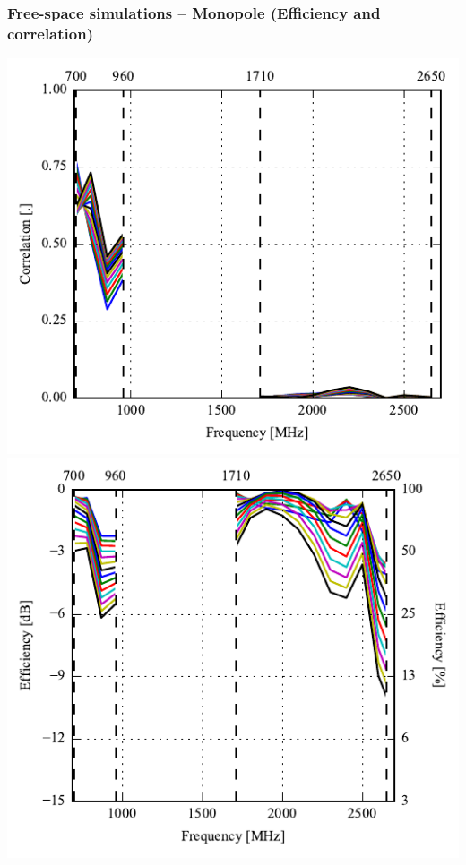 \begin{frame}
    \frametitle{Free-space simulations -- Monopole (Efficiency and correlation)}
    \vspace*{-0.5cm}
  \begin{minipage}[t]{0.49\linewidth}
    \vspace{0mm}

    \includegraphics[width=0.78\linewidth]{img/henrik/mono/s11_corr} \\
    \includegraphics[width=0.82\linewidth]{img/henrik/mono/efficiency-ac1-csh1} 

  \end{minipage}\hfill       
  \begin{minipage}[t]{0.49\linewidth}
    \vspace{0 mm}


\end{minipage}
\end{frame}
